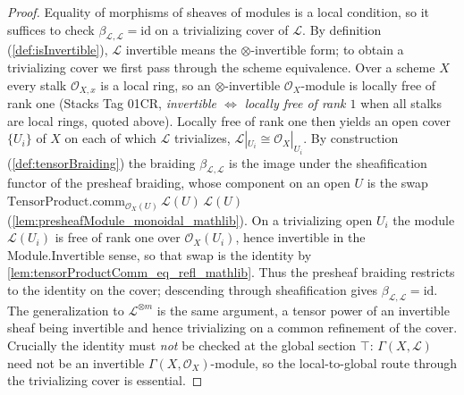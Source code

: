 \begin{proof}
  Equality of morphisms of sheaves of modules is a local condition, so it suffices
  to check \(\beta_{\mathcal{L},\mathcal{L}} = \mathrm{id}\) on a trivializing
  cover of \(\mathcal{L}\). By definition (\cref{def:isInvertible}), \(\mathcal{L}\) invertible means the \(\otimes\)-invertible form; to obtain
  a trivializing cover we first pass through the scheme equivalence. Over a scheme
  \(X\) every stalk \(\mathcal{O}_{X,x}\) is a local ring, so an
  \(\otimes\)-invertible \(\mathcal{O}_X\)-module is locally free of rank one
  (Stacks Tag 01CR, \emph{invertible \(\Longleftrightarrow\) locally free of rank
  \(1\)} when all stalks are local rings, quoted above). Locally free of rank one
  then yields an open cover \(\{U_i\}\) of \(X\) on each of which \(\mathcal{L}\)
  trivializes, \(\mathcal{L}|_{U_i} \cong \mathcal{O}_X|_{U_i}\). By construction
  (\cref{def:tensorBraiding}) the braiding \(\beta_{\mathcal{L},\mathcal{L}}\) is
  the image under the sheafification functor of the presheaf braiding, whose
  component on an open \(U\) is the swap
  \(\mathrm{TensorProduct.comm}_{\mathcal{O}_X(U)}\,\mathcal{L}(U)\,\mathcal{L}(U)\)
  (\cref{lem:presheafModule_monoidal_mathlib}). On a trivializing open \(U_i\) the
  module \(\mathcal{L}(U_i)\) is free of rank one over \(\mathcal{O}_X(U_i)\),
  hence invertible in the \(\mathrm{Module.Invertible}\) sense, so that swap is the
  identity by \cref{lem:tensorProductComm_eq_refl_mathlib}. Thus the presheaf
  braiding restricts to the identity on the cover; descending through
  sheafification gives \(\beta_{\mathcal{L},\mathcal{L}} = \mathrm{id}\). The
  generalization to \(\mathcal{L}^{\otimes m}\) is the same argument, a tensor
  power of an invertible sheaf being invertible and hence trivializing on a common
  refinement of the cover. Crucially the identity must \emph{not} be checked at the
  global section \(\top\): \(\Gamma(X,\mathcal{L})\) need not be an invertible
  \(\Gamma(X,\mathcal{O}_X)\)-module, so the local-to-global route through the
  trivializing cover is essential.
\end{proof}

